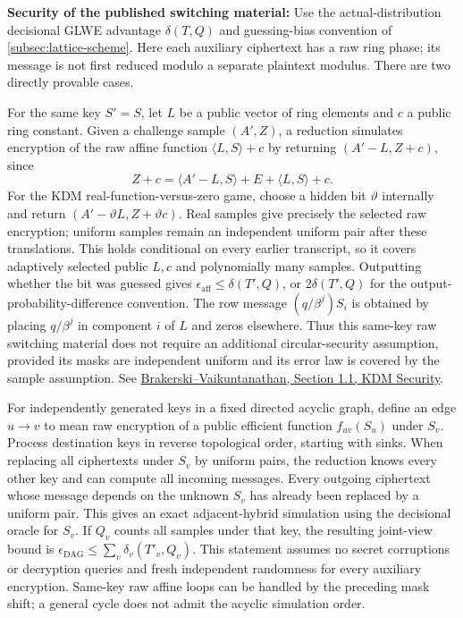 \noindent\textbf{Security of the published switching material:} Use the actual-distribution decisional GLWE advantage $\delta(T,Q)$ and guessing-bias convention of \autoref{subsec:lattice-scheme}. Here each auxiliary ciphertext has a raw ring phase; its message is not first reduced modulo a separate plaintext modulus. There are two directly provable cases.

For the same key $S'=S$, let $L$ be a public vector of ring elements and $c$ a public ring constant. Given a challenge sample $(A',Z)$, a reduction simulates encryption of the raw affine function $\langle L,S\rangle+c$ by returning $(A'-L,Z+c)$, since
\[
Z+c=\langle A'-L,S\rangle+E+\langle L,S\rangle+c.
\]
For the KDM real-function-versus-zero game, choose a hidden bit $\vartheta$ internally and return $(A'-\vartheta L,Z+\vartheta c)$. Real samples give precisely the selected raw encryption; uniform samples remain an independent uniform pair after these translations. This holds conditional on every earlier transcript, so it covers adaptively selected public $L,c$ and polynomially many samples. Outputting whether the bit was guessed gives $\epsilon_{\mathrm{aff}}\le\delta(T',Q)$, or $2\delta(T',Q)$ for the output-probability-difference convention. The row message $(q/\beta^j)S_i$ is obtained by placing $q/\beta^j$ in component $i$ of $L$ and zeros elsewhere. Thus this same-key raw switching material does not require an additional circular-security assumption, provided its masks are independent uniform and its error law is covered by the sample assumption. See \href{https://www.cs.toronto.edu/~vinodv/BV-Crypto2011.pdf}{Brakerski--Vaikuntanathan, Section 1.1, KDM Security}.

For independently generated keys in a fixed directed acyclic graph, define an edge $u\to v$ to mean raw encryption of a public efficient function $f_{uv}(S_u)$ under $S_v$. Process destination keys in reverse topological order, starting with sinks. When replacing all ciphertexts under $S_v$ by uniform pairs, the reduction knows every other key and can compute all incoming messages. Every outgoing ciphertext whose message depends on the unknown $S_v$ has already been replaced by a uniform pair. This gives an exact adjacent-hybrid simulation using the decisional oracle for $S_v$. If $Q_v$ counts all samples under that key, the resulting joint-view bound is $\epsilon_{\mathrm{DAG}}\le\sum_v\delta_v(T'_v,Q_v)$. This statement assumes no secret corruptions or decryption queries and fresh independent randomness for every auxiliary encryption. Same-key raw affine loops can be handled by the preceding mask shift; a general cycle does not admit the acyclic simulation order.

